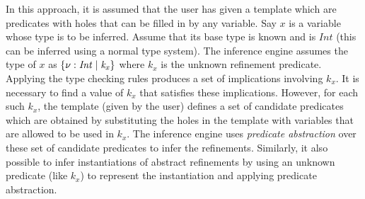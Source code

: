 In this approach, it is assumed that the user has given a template which are predicates with holes that can be filled in by any variable. 
Say $x$ is a variable whose type is to be inferred. Assume that its base type 
is known and is $Int$ (this can be inferred using a normal type system).
The inference engine assumes the type of $x$ as $\mathit{\{ \nu: Int \; | \; k_x\}}$ where $k_x$ is the unknown refinement predicate. 
Applying the type checking rules produces a set of implications involving $k_x$.
It is necessary to find a value of $k_x$ that satisfies these implications.
However, for each such $k_x$, the template (given by the user) defines a set of candidate predicates which are obtained by substituting the holes in the template with variables that are allowed to be used in $k_x$.
The inference engine uses \emph{predicate abstraction} over these set of candidate predicates to infer the refinements.
Similarly, it also possible to infer instantiations of abstract refinements by 
using an unknown predicate (like $k_x$) to represent the instantiation and applying predicate abstraction.

